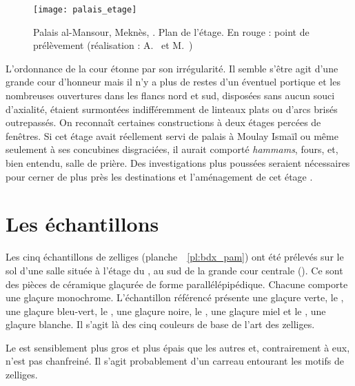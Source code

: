 \begin{figure}[htb]
  \texttt{[image: palais\_etage]}
  \caption{Palais al-Mansour, Meknès, . 
           Plan de l'étage. En rouge : point de prélèvement 
           (réalisation : A.~ et M.~)}
  \label{fig:etage}
\end{figure}

L'ordonnance de la cour étonne par son irrégularité. Il semble s'être 
agit d'une grande cour d'honneur mais il n'y a plus de restes d'un 
éventuel portique et les nombreuses ouvertures dans les flancs nord 
et sud, disposées sans aucun souci d'axialité, étaient surmontées 
indifféremment de linteaux plats ou d'arcs brisés outrepassés. On 
reconnaît certaines constructions à deux étages percées de fenêtres. 
Si cet étage avait réellement servi de palais à Moulay Ismaïl ou 
même seulement à ses concubines disgraciées, il aurait comporté 
\emph{hammams}, fours, et, bien entendu, salle de prière. 
Des investigations plus poussées seraient nécessaires pour cerner 
de plus près les destinations et l'aménagement de cet étage 
\autocite{Barrucand_1976}.

\section{Les échantillons}

Les cinq échantillons de zelliges (planche~~\ref{pl:bdx_pam}) ont été 
prélevés sur le sol d'une salle située à l'étage du \PaM, au sud de 
la grande cour centrale (). Ce sont des pièces de 
céramique glaçurée de forme parallélépipédique. Chacune comporte une 
glaçure monochrome. L'échantillon référencé  présente une 
glaçure verte, le , une glaçure bleu-vert, le , 
une glaçure noire, le , une glaçure miel et le , 
une glaçure blanche. Il s'agit là des cinq couleurs de base de l'art 
des zelliges.

Le  est sensiblement plus gros et plus épais que les autres 
et, contrairement à eux, n'est pas chanfreiné. Il s'agit probablement 
d'un carreau entourant les motifs de zelliges.




\cleardoublepage
\thispagestyle{empty}

